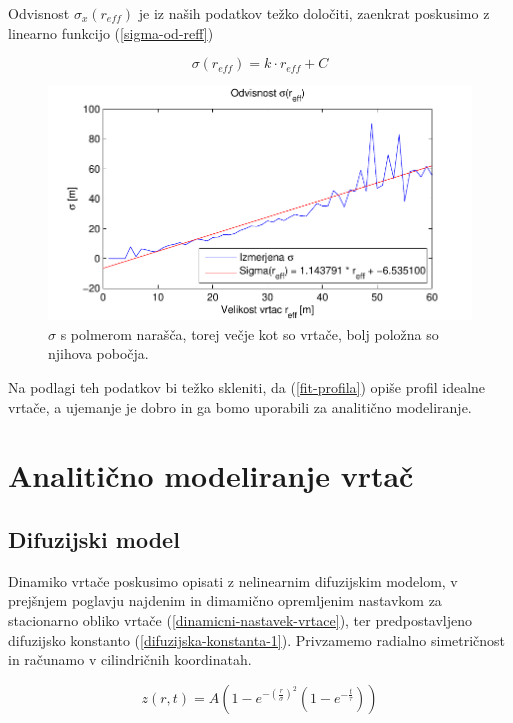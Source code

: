 \documentclass[a4paper, oneside, 12pt]{book}
\begin{document}
  Odvisnost $\sigma_x(r_{eff})$ je iz naših podatkov težko določiti, zaenkrat poskusimo z linearno funkcijo (\ref{sigma-od-reff})


  \begin{equation}
    \sigma (r_{eff}) = k \cdot r_{eff} + C
    \label{sigma-od-reff}
  \end{equation}

  \begin{figure}[H]
    \centering
    \includegraphics{slike/menisija-sigme}
    \caption{$\sigma$ s polmerom narašča, torej večje kot so vrtače, bolj položna so njihova pobočja.}
    \label{fig:menisija-sigma}
  \end{figure}

  Na podlagi teh podatkov bi težko skleniti, da (\ref{fit-profila}) opiše profil idealne vrtače, a ujemanje je dobro in ga bomo uporabili za analitično modeliranje. 


  \chapter{Analitično modeliranje vrtač}
  \label{analiticno-modeliranje}

  \section{Difuzijski model}

  Dinamiko vrtače poskusimo opisati z nelinearnim difuzijskim modelom, v prejšnjem poglavju najdenim in dimamično opremljenim nastavkom za stacionarno obliko vrtače (\ref{dinamicni-nastavek-vrtace}), ter  predpostavljeno difuzijsko konstanto (\ref{difuzijska-konstanta-1}). Privzamemo radialno simetričnost in računamo v cilindričnih koordinatah.

  \begin{equation}
    z(r,t) = A\left(1-e^{-\left(\frac{r}{\sigma }\right)^2}\left(1-e^{-\frac{t}{\tau }}\right)\right)
    \label{dinamicni-nastavek-vrtace}
  \end{equation}
\end{document}
